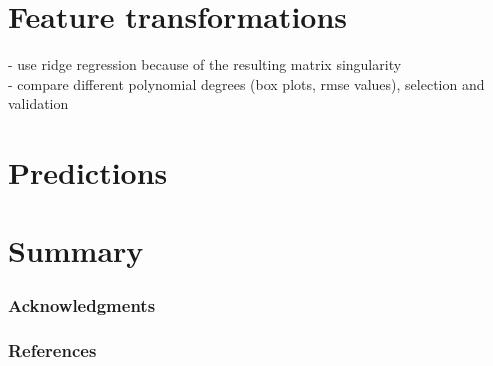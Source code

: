 \documentclass{article} %
\begin{document}
\section{Feature transformations}
  - use ridge regression because of the resulting matrix singularity\\
  - compare different polynomial degrees (box plots, rmse values), selection and validation

\section{Predictions}

\section{Summary}

\subsubsection*{Acknowledgments}

\subsubsection*{References}
\end{document}
